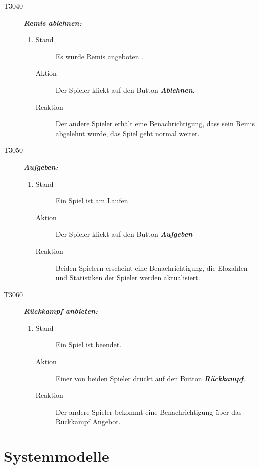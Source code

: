 \documentclass[parskip=full]{scrartcl}
\begin{document}
\begin{description}
	\item[T3040] \textbf{\textit{Remis ablehnen: }} 
	\begin{enumerate}
		\item 
		\begin{description}
			\item[Stand] Es wurde Remis angeboten .
			\item[Aktion] Der Spieler klickt auf den Button \textbf{\textit{Ablehnen}}. 
			\item[Reaktion] Der andere Spieler erhält eine Benachrichtigung, dass sein Remis abgelehnt wurde, das Spiel geht normal weiter.
		\end{description}
	\end{enumerate}
	
	\item[T3050] \textbf{\textit{Aufgeben: }} 
	\begin{enumerate}
		\item 
		\begin{description}
			\item[Stand] Ein Spiel ist am Laufen.
			\item[Aktion] Der Spieler klickt auf den Button \textbf{\textit{Aufgeben}} 
			\item[Reaktion] Beiden Spielern erscheint eine Benachrichtigung, die Elozahlen und Statistiken der Spieler werden aktualisiert.
		\end{description}
	\end{enumerate}
	
	\item[T3060] \textbf{\textit{Rückkampf anbieten: }} 
	\begin{enumerate}
		\item 
		\begin{description}
			\item[Stand] Ein Spiel ist beendet.
			\item[Aktion] Einer von beiden Spieler drückt auf den Button \textbf{\textit{Rückkampf}}.
			\item[Reaktion] Der andere Spieler bekommt eine Benachrichtigung über das Rückkampf Angebot.
		\end{description}
	\end{enumerate}
	
	
\end{description}



\pagebreak
\section{Systemmodelle}
\end{document}
